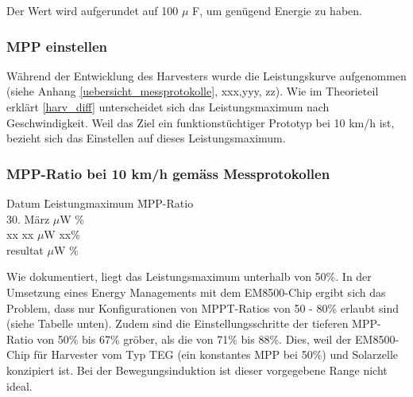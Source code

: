 Der Wert wird aufgerundet auf 100 $\mu$ F, um genügend Energie zu haben.

\subsubsection{MPP einstellen}


Während der Entwicklung des Harvesters wurde die Leistungskurve aufgenommen (siehe Anhang \ref{uebersicht_messprotokolle}, xxx,yyy, zz). Wie im Theorieteil erklärt \ref{harv_diff} unterscheidet sich das Leistungsmaximum nach Geschwindigkeit. Weil das Ziel ein funktionstüchtiger Prototyp bei 10 km/h ist, bezieht sich das Einstellen auf dieses Leistungsmaximum.  

 
\subsubsection*{MPP-Ratio bei 10 km/h gemäss Messprotokollen}
\begin{tabbing}
    Datum       \quad\= Leistungmaximum    \quad\= MPP-Ratio\\[0.8ex]
    30. März     $\mu$W        \thinspace\% \\
    xx          \> xx $\mu$W        \> xx\thinspace\%\\
    resultat      $\mu$W    \thinspace\%\\
\end{tabbing}


Wie dokumentiert, liegt das Leistungsmaximum unterhalb von 50\thinspace\%. In der Umsetzung eines Energy Managements mit dem EM8500-Chip ergibt sich das Problem, dass nur Konfigurationen von MPPT-Ratios von 50 - 80\thinspace\% erlaubt sind (siehe Tabelle unten). Zudem sind die Einstellungsschritte der tieferen MPP-Ratio von 50\thinspace\% bis 67\thinspace\% gröber, als die von 71\thinspace\% bis 88\thinspace\%. Dies, weil der EM8500-Chip für Harvester vom Typ TEG (ein konstantes MPP bei 50\thinspace\%) und Solarzelle konzipiert ist. Bei der Bewegungsinduktion ist dieser vorgegebene Range nicht ideal.


